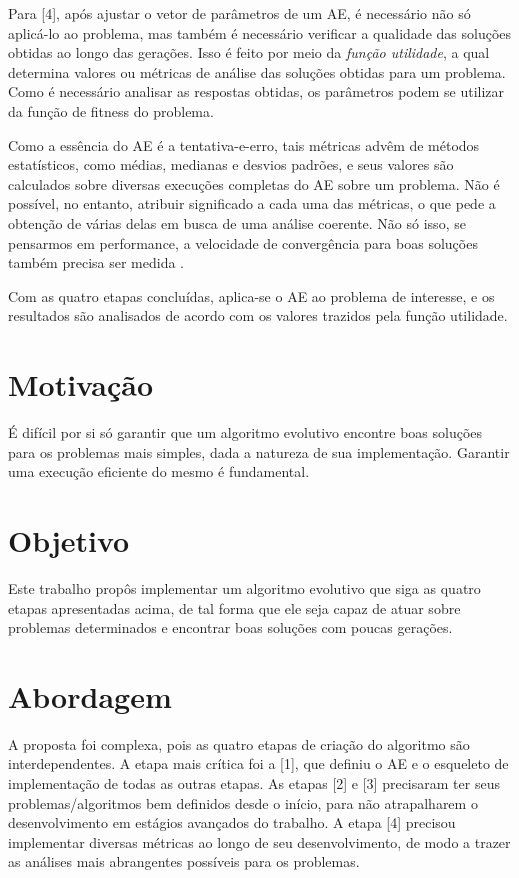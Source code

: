 Para [4], após ajustar o vetor de parâmetros de um AE, é necessário não só aplicá-lo ao problema, mas também é necessário verificar a qualidade das soluções obtidas ao longo das gerações. Isso é feito por meio da \emph{função utilidade}, a qual determina valores ou métricas de análise das soluções obtidas para um problema. Como é necessário analisar as respostas obtidas, os parâmetros podem se utilizar da função de fitness do problema. 

Como a essência do AE é a tentativa-e-erro, tais métricas advêm de métodos estatísticos, como médias, medianas e desvios padrões, e seus valores são calculados sobre diversas execuções completas do AE sobre um problema. Não é possível, no entanto, atribuir significado a cada uma das métricas, o que pede a obtenção de várias delas em busca de uma análise coerente. Não só isso, se pensarmos em performance, a velocidade de convergência para boas soluções também precisa ser medida \cite{eiben2011parameter}.

Com as quatro etapas concluídas, aplica-se o AE ao problema de interesse, e os resultados são analisados de acordo com os valores trazidos pela função utilidade.

\section{Motivação}

É difícil por si só garantir que um algoritmo evolutivo encontre boas soluções para os problemas mais simples, dada a natureza de sua implementação. Garantir uma execução eficiente do mesmo é fundamental.

\section{Objetivo}

Este trabalho propôs implementar um algoritmo evolutivo que siga as quatro etapas apresentadas acima, de tal forma que ele seja capaz de atuar sobre problemas determinados e encontrar boas soluções com poucas gerações.

\section{Abordagem}

A proposta foi complexa, pois as quatro etapas de criação do algoritmo são interdependentes. A etapa mais crítica foi a [1], que definiu o AE e o esqueleto de implementação de todas as outras etapas. As etapas [2] e [3] precisaram ter seus problemas/algoritmos bem definidos desde o início, para não atrapalharem o desenvolvimento em estágios avançados do trabalho. A etapa [4] precisou implementar diversas métricas ao longo de seu desenvolvimento, de modo a trazer as análises mais abrangentes possíveis para os problemas.

